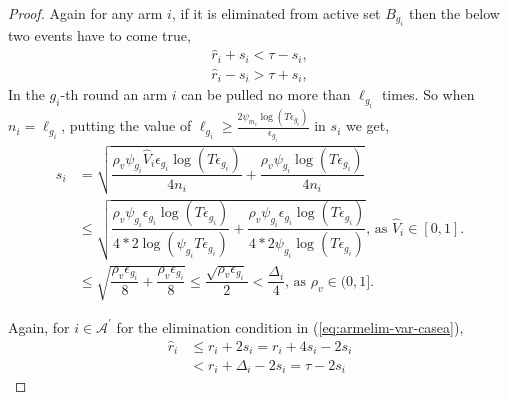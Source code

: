 \begin{proof}
Again for any arm $i$, if it is eliminated from active set $B_{g_{i}}$ then the below two events have to come true,
\begin{align}
\hat{r}_{i} + s_{i} < \tau - s_{i}, \label{eq:armelim-var-casea}\\
\hat{r}_{i} - s_{i} > \tau + s_{i}, \label{eq:armelim-var-caseb}
\end{align}
%
In the $g_{i}$-th round an arm $i$ can be pulled no more than $\ell_{g_{i}}$ times. So when $n_{i}=\ell_{g_{i}}$, putting the value of $\ell_{g_{i}}\ge\frac{2\psi_{m_i}\log{( T\epsilon_{g_{i}})}}{\epsilon_{g_{i}}}$ in $s_{i}$ we get, 
\begin{align*}
s_{i}&=\sqrt{\dfrac{\rho_v \psi_{g_i} \hat{V}_{i} \epsilon_{g_{i}}\log ( T\epsilon_{g_{i}})}{4 n_{i}} + \dfrac{\rho_v \psi_{g_i}\log{( T\epsilon_{g_{i}})}}{4 n_{i}}} \\
&\leq \sqrt{\dfrac{\rho_v\psi_{g_i} \epsilon_{g_{i}}\log ( T\epsilon_{g_{i}})}{4*2 \log(\psi_{g_i} T\epsilon_{g_{i}})} + \dfrac{\rho_v \psi_{g_i}\epsilon_{g_{i}} \log{( T\epsilon_{g_{i}})}}{4*2\psi_{g_i} \log( T\epsilon_{g_{i}})} } \text{, as }\hat{V}_{i}\in [0,1].\\
& \leq \sqrt{\dfrac{\rho_v \epsilon_{g_{i}}}{8} + \dfrac{\rho_v \epsilon_{g_{i}}}{8} } \leq \dfrac{\sqrt{\rho_v \epsilon_{g_{i}}}}{2}< \dfrac{\Delta_{i}}{4} \text{, as }\rho_v\in (0,1].
\end{align*}

Again, for ${i} \in \mathcal{A}^{'}$ for the elimination condition in (\ref{eq:armelim-var-casea}),
\begin{align*}
\hat{r}_{i} &\leq r_{i} + 2s_{i} = r_{i} + 4s_{i} - 2s_{i} \\
&< r_{i} + \Delta_{i} - 2s_{i} = \tau -2s_{i} %
\end{align*}



\end{proof}
